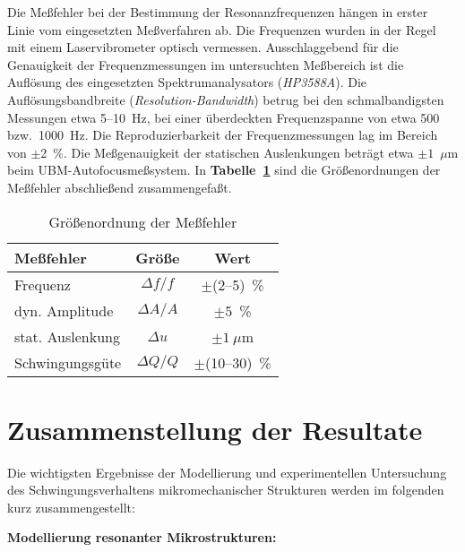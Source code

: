 Die Meßfehler bei der Bestimmung der Resonanzfrequenzen hängen in erster
Linie vom eingesetzten Meßverfahren ab. Die Frequenzen wurden in der Regel
mit einem Laservibrometer optisch vermessen. Ausschlaggebend für die
Genauigkeit der Frequenzmessungen im untersuchten Meßbereich ist die
Auflösung des eingesetzten Spektrumanalysators ({\sl HP3588A}).
Die Auflösungsbandbreite ({\em Resolution-Bandwidth}) betrug bei den
schmalbandigsten Messungen etwa 5--10~Hz, bei einer
überdeckten Frequenzspanne von etwa 500 bzw.\ 1000~Hz.
Die Reproduzierbarkeit der Frequenzmessungen lag im Bereich von
$\pm$2~\%.
Die Meßgenauigkeit der statischen Auslenkungen beträgt etwa
$\pm1$~$\mu$m beim UBM-Autofocusmeßsystem.
In {\bf Tabelle~\ref{tabmessfehler}} sind die
Größenordnungen der Meßfehler ab\-schließend zusammengefaßt.
\begin{table}[htb]
\caption{\label{tabmessfehler}
 Größenordnung der Meßfehler}
\begin{center}
\begin{tabular}{|l||c|c|}
\hline
  Meßfehler  &  Größe   &  Wert  \\
\hline \hline
Frequenz          &  $\Delta f/f$   &  $\pm$(2--5)~\%   \\
dyn. Amplitude    &  $\Delta A/A$   &  $\pm5$~\%      \\
stat. Auslenkung  &  $\Delta u$     &  $\pm1~\mu$m    \\
Schwingungsgüte   &  $\Delta Q/Q$   &  $\pm$(10--30)~\% \\
\hline
\end{tabular}
\end{center}
\end{table}



\newpage
\section{Zusammenstellung der Resultate}
\label{resultateschwingungsverhalten}

Die wichtigsten Ergebnisse der Modellierung und experimentellen Untersuchung
des Schwingungsverhaltens mikromechanischer Strukturen werden im folgenden
kurz zusammengestellt:


{\bf Modellierung resonanter Mikrostrukturen:}

